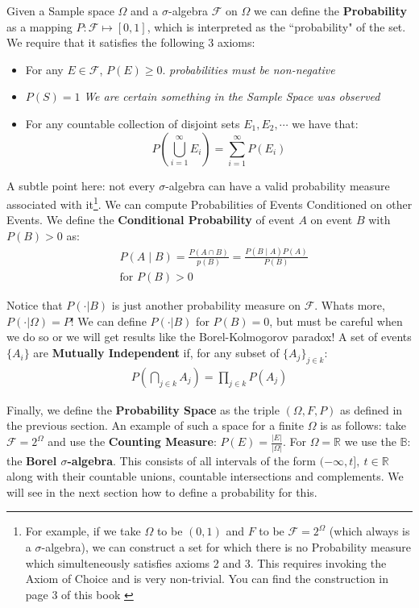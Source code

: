 \documentclass[]{article}
\theoremstyle{mattstyle}
\theoremstyle{definition}
\begin{document}
Given a Sample space $\Omega$ and a $\sigma$-algebra $\mathcal{F}$ on $\Omega$ we can define the \textbf{Probability} as a mapping \(P: \mathcal{F} \mapsto [0,1] \), which is interpreted as the ``probability" of the set. We require that it satisfies the following 3 axioms:
\begin{itemize}
	\item For any \( E \in \mathcal{F} \), \(P(E) \ge 0.\) \emph{probabilities must be non-negative}
	\item \(P(S)=1\) \emph{We are certain something in the Sample Space was observed}
	\item For any countable collection of disjoint sets \(E_1, E_2, \cdots \) we have that: $$P\left(\bigcup_{i=1}^{\infty} E_i\right) = \sum_{i=1}^{\infty} P\left(E_i\right)$$
\end{itemize}

A subtle point here: not every $\sigma$-algebra can have a valid probability measure associated with it\footnote{For example, if we take $\Omega$ to be $(0,1)$ and $F$ to be $\mathcal{F}=2^{\Omega}$ (which always is a $\sigma$-algebra), we can construct a set for which there is no Probability measure which simulteneously satisfies axioms 2 and 3. This requires invoking the Axiom of Choice and is very non-trivial. You can find the construction in page 3 of this book \cite{rosenthalbook}}. We can compute Probabilities of Events Conditioned on other Events. We define the \textbf{Conditional Probability} of event \(A\) on event \(B\) with \(P(B) > 0\) as:
\begin{align*}
&P(A \mid B) = \frac{P(A \cap B)}{p(B)} = \frac{P(B \mid A)P(A)}{P(B)}\\
&\text{for $P(B) > 0$}
\end{align*}

Notice that $P(\cdot|B)$ is just another probability measure on \(\mathcal{F}\). Whats more, $P(\cdot|\Omega) = P$! We can define $P(\cdot|B)$ for $P(B)=0$, but must be careful when we do so or we will get results like the Borel-Kolmogorov paradox! A set of events \(\{A_i\}\) are \textbf{Mutually Independent} if, for any subset of \(\{A_j\}_{j\in k}\):
\begin{align*}
P \left( \bigcap_{j\in k} A_j \right) = \prod_{j\in k}P(A_j) 
\end{align*}

Finally, we define the \textbf{Probability Space} as the triple \( (\Omega, F, P)\) as defined in the previous section. An example of such a space for a finite $\Omega$ is as follows: take $\mathcal{F}=2^{\Omega}$ and use the \textbf{Counting Measure}: $P(E) = \frac{|E|}{|\Omega|}$. For $\Omega = \mathbb{R}$ we use the $\mathbb{B}$: the \textbf{Borel $\sigma$-algebra}. This consists of all intervals of the form $(-\infty, t], \ t \in \mathbb{R}$ along with their countable unions, countable intersections and complements. We will see in the next section how to define a probability for this.
\end{document}
